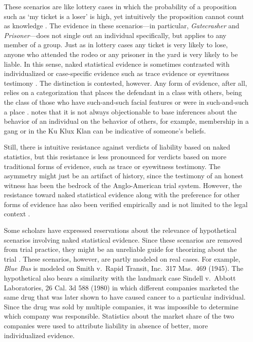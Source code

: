 \documentclass{article}
\begin{document}
These scenarios are like lottery cases in which the probability of a proposition such as `my ticket is a loser' is high,  yet intuitively the proposition cannot count as knowledge \citep[see e.g.][]{Harman1968, Nelkin2000The-Lottery-Par, hawthorne2004knowledge, Lawlor2013Assurance,  ebert2018}. 
The  evidence in these scenarios---in particular, \textit{Gatecrasher} and \textit{Prisoner}---does not single out an individual specifically, but applies to any member of a group.  
Just as in lottery cases any ticket is very likely to lose,
 anyone who attended the rodeo or any prisoner in the yard is very likely to be liable.  
 In this sense, naked statistical evidence is sometimes contrasted with individualized or case-specific evidence such as trace evidence or eyewitness testimony \citep{williams1979, Thomson86, colyvan2001crime}.
 The distinction is contested, however. Any form of evidence, after all, relies on a categorization that places the defendant in a class with others, being the class of those  who have such-and-such facial features or were in such-and-such a place \citep{saks1980human,schoeman87,Wright1988Causation,Shauer2003Profiles-Probab, harcourt2006}.
  \cite{tillers97, tillers2005if} notes that it is not always objectionable to base inferences about the behavior of an individual on the behavior of others, for example,  membership in a gang or in the Ku Klux Klan can be indicative of someone's beliefs.
  
  
Still, there is intuitive resistance against verdicts of liability based on naked statistics, but this resistance is less pronounced for verdicts based on more traditional forms of evidence, such as trace or eyewitness testimony. %
The asymmetry might just be an artifact of history, since the testimony of an honest witness has been the bedrock of the Anglo-American trial system. 
However, the resistance toward naked statistical evidence along with the preference for other forms of evidence has also been verified empirically  \citep{wells1992naked, niedermeierEtAl1999, arkesEtAl2012} and is not limited to the legal context \citep{sykes1999, friedman2015, ebert2018}. 


Some scholars have expressed reservations about the relevance of hypothetical scenarios involving naked statistical evidence. Since these scenarios are removed from trial practice, they might be an unreliable guide for theorizing about the trial  \citep{Schmalbeck86,dant1988gambling,Allen2001Naturalized}.
These scenarios, however, are partly modeled on real cases. For example, \textit{Blue Bus} is modeled on Smith v.\ Rapid Transit, Inc.\ 317 Mas.\ 469
(1945). The hypothetical also bears a similarity with the landmark case Sindell v.\ Abbott Laboratories, 26 Cal. 3d 588 (1980) in which different companies marketed the same drug that was later shown to have caused cancer to a particular individual. Since the drug was sold by multiple companies, it was impossible to determine which company was responsible. Statistics about the market share of the two companies were used to attribute liability in absence of better, more individualized evidence. 
\end{document}
